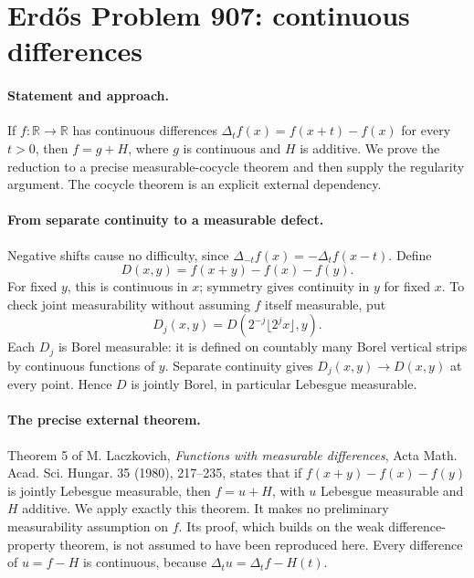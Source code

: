 \section*{Erd\H{o}s Problem 907: continuous differences}

\paragraph{Statement and approach.}
If \(f:\mathbb R\to\mathbb R\) has continuous differences
\(\Delta_t f(x)=f(x+t)-f(x)\) for every \(t>0\), then
\(f=g+H\), where \(g\) is continuous and \(H\) is additive.
We prove the reduction to a precise measurable-cocycle
theorem and then supply the regularity argument.
The cocycle theorem is an explicit external dependency.

\paragraph{From separate continuity to a measurable defect.}
Negative shifts cause no difficulty, since
\(\Delta_{-t}f(x)=-\Delta_t f(x-t)\).
Define
\[
 D(x,y)=f(x+y)-f(x)-f(y).
\]
For fixed \(y\), this is continuous in \(x\); symmetry
gives continuity in \(y\) for fixed \(x\).
To check joint measurability without assuming \(f\)
itself measurable, put
\[
 D_j(x,y)=D(2^{-j}\lfloor2^jx\rfloor,y).
\]
Each \(D_j\) is Borel measurable: it is defined on
countably many Borel vertical strips by continuous
functions of \(y\). Separate continuity gives
\(D_j(x,y)\to D(x,y)\) at every point. Hence \(D\)
is jointly Borel, in particular Lebesgue measurable.

\paragraph{The precise external theorem.}
Theorem 5 of M. Laczkovich,
\emph{Functions with measurable differences},
Acta Math. Acad. Sci. Hungar. 35 (1980), 217--235,
states that if \(f(x+y)-f(x)-f(y)\) is jointly
Lebesgue measurable, then \(f=u+H\), with \(u\)
Lebesgue measurable and \(H\) additive.
We apply exactly this theorem. It makes no preliminary
measurability assumption on \(f\).
Its proof, which builds on the weak difference-property
theorem, is not assumed to have been reproduced here.
Every difference of \(u=f-H\) is continuous, because
\(\Delta_tu=\Delta_tf-H(t)\).

